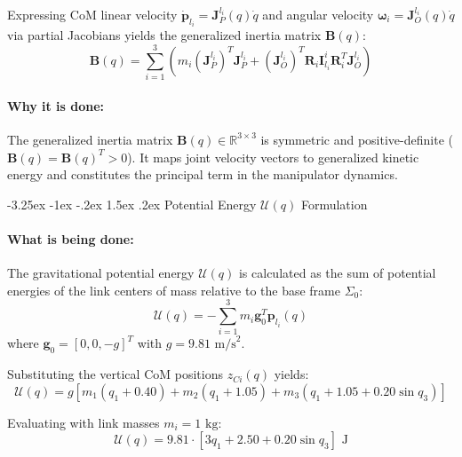 \documentclass[11pt, a4paper]{article}
\makeatletter
\renewcommand{\subsection}{\@startsection{subsection}{2}{\z@}%
    {-3.25ex \@plus -1ex \@minus -.2ex}%
    {1.5ex \@plus .2ex}%
    {\normalfont\large\bfseries\color{brandaccent}}}
\makeatother
\begin{document}
Expressing CoM linear velocity $\dot{\mathbf{p}}_{l_i} = \mathbf{J}_{P}^{l_i}(q) \dot{q}$ and angular velocity $\boldsymbol{\omega}_i = \mathbf{J}_{O}^{l_i}(q) \dot{q}$ via partial Jacobians yields the generalized inertia matrix $\mathbf{B}(q)$:
\begin{equation}
    \mathbf{B}(q) = \sum_{i=1}^{3} \left( m_i (\mathbf{J}_{P}^{l_i})^T \mathbf{J}_{P}^{l_i} + (\mathbf{J}_{O}^{l_i})^T \mathbf{R}_i \mathbf{I}_{l_i}^i \mathbf{R}_i^T \mathbf{J}_{O}^{l_i} \right)
\end{equation}

\paragraph{Why it is done:}
The generalized inertia matrix $\mathbf{B}(q) \in \mathbb{R}^{3 \times 3}$ is symmetric and positive-definite ($\mathbf{B}(q) = \mathbf{B}(q)^T > 0$). It maps joint velocity vectors to generalized kinetic energy and constitutes the principal term in the manipulator dynamics.

\subsection{Potential Energy \texorpdfstring{$\mathcal{U}(q)$}{U(q)} Formulation}
\paragraph{What is being done:}
The gravitational potential energy $\mathcal{U}(q)$ is calculated as the sum of potential energies of the link centers of mass relative to the base frame $\Sigma_0$:
\begin{equation}
    \mathcal{U}(q) = -\sum_{i=1}^{3} m_i \mathbf{g}_0^T \mathbf{p}_{l_i}(q)
\end{equation}
where $\mathbf{g}_0 = [0, 0, -g]^T$ with $g = 9.81\text{ m/s}^2$.

Substituting the vertical CoM positions $z_{Ci}(q)$ yields:
\begin{equation}
    \mathcal{U}(q) = g \left[ m_1 (q_1 + 0.40) + m_2 (q_1 + 1.05) + m_3 \left( q_1 + 1.05 + 0.20 \sin q_3 \right) \right]
\end{equation}

Evaluating with link masses $m_i = 1\text{ kg}$:
\begin{equation}
    \mathcal{U}(q) = 9.81 \cdot \left[ 3 q_1 + 2.50 + 0.20 \sin q_3 \right] \text{ J}
\end{equation}
\end{document}
